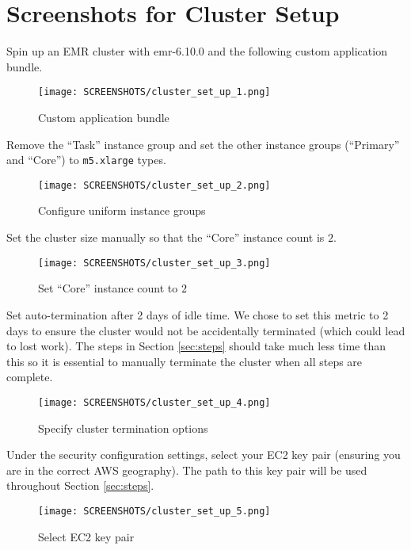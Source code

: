 \documentclass[11pt]{article}
\begin{document}
\appendix

\section{Screenshots for Cluster Setup}
\label{app:screenshots}
\appendix

Spin up an EMR cluster with emr-6.10.0 and the following custom application bundle.

\begin{figure}[H]
  \centering
  \texttt{[image: SCREENSHOTS/cluster\_set\_up\_1.png]}
  \caption{Custom application bundle}
  \label{fig:cluster-setup-1}
\end{figure}

Remove the ``Task'' instance group and set the other instance groups (``Primary'' and ``Core'') to \texttt{m5.xlarge} types. 

\begin{figure}[H]
  \centering
  \texttt{[image: SCREENSHOTS/cluster\_set\_up\_2.png]}
  \caption{Configure uniform instance groups}
  \label{fig:cluster-setup-2}
\end{figure}

Set the cluster size manually so that the ``Core'' instance count is $2$.

\begin{figure}[H]
  \centering
  \texttt{[image: SCREENSHOTS/cluster\_set\_up\_3.png]}
  \caption{Set ``Core'' instance count to $2$}
  \label{fig:cluster-setup-3}
\end{figure}

Set auto-termination after 2 days of idle time. We chose to set this metric to 2 days to ensure the cluster would not be accidentally terminated (which could lead to lost work). The steps in Section \ref{sec:steps} should take much less time than this so it is essential to manually terminate the cluster when all steps are complete. 

\begin{figure}[H]
  \centering
  \texttt{[image: SCREENSHOTS/cluster\_set\_up\_4.png]}
  \caption{Specify cluster termination options}
  \label{fig:cluster-setup-4}
\end{figure}

Under the security configuration settings, select your EC2 key pair (ensuring you are in the correct AWS geography). The path to this key pair will be used throughout Section \ref{sec:steps}.

\begin{figure}[H]
  \centering
  \texttt{[image: SCREENSHOTS/cluster\_set\_up\_5.png]}
  \caption{Select EC2 key pair}
  \label{fig:cluster-setup-5}
\end{figure}
\end{document}
